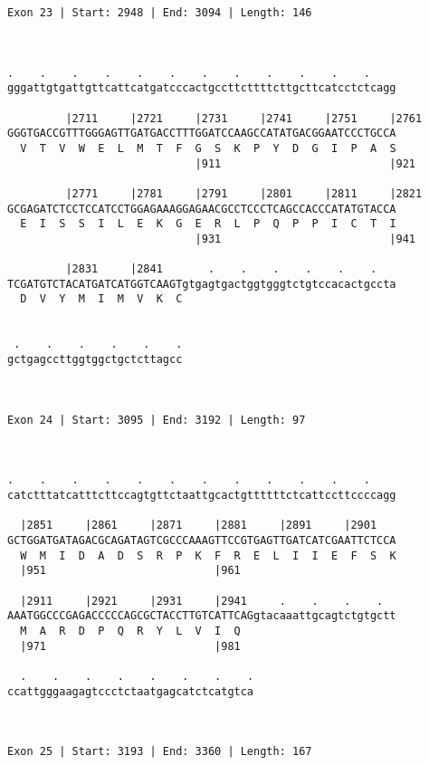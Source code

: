 \documentclass{article}
\begin{document}
{\begin{Verbatim}
Exon 23 | Start: 2948 | End: 3094 | Length: 146



.    .    .    .    .    .    .    .    .    .    .    .    
gggattgtgattgttcattcatgatcccactgccttcttttcttgcttcatcctctcagg
                                                            
         |2711     |2721     |2731     |2741     |2751     |2761
GGGTGACCGTTTGGGAGTTGATGACCTTTGGATCCAAGCCATATGACGGAATCCCTGCCA
  V  T  V  W  E  L  M  T  F  G  S  K  P  Y  D  G  I  P  A  S
                             |911                          |921
  
         |2771     |2781     |2791     |2801     |2811     |2821
GCGAGATCTCCTCCATCCTGGAGAAAGGAGAACGCCTCCCTCAGCCACCCATATGTACCA
  E  I  S  S  I  L  E  K  G  E  R  L  P  Q  P  P  I  C  T  I
                             |931                          |941
  
         |2831     |2841       .    .    .    .    .    .   
TCGATGTCTACATGATCATGGTCAAGTgtgagtgactggtgggtctgtccacactgccta
  D  V  Y  M  I  M  V  K  C                                 
                                                            
  
 .    .    .    .    .    .
gctgagccttggtggctgctcttagcc
                           
                           
 
Exon 24 | Start: 3095 | End: 3192 | Length: 97



.    .    .    .    .    .    .    .    .    .    .    .    
catctttatcatttcttccagtgttctaattgcactgttttttctcattccttccccagg
                                                            
  |2851     |2861     |2871     |2881     |2891     |2901   
GCTGGATGATAGACGCAGATAGTCGCCCAAAGTTCCGTGAGTTGATCATCGAATTCTCCA
  W  M  I  D  A  D  S  R  P  K  F  R  E  L  I  I  E  F  S  K
  |951                          |961                        
  
  |2911     |2921     |2931     |2941     .    .    .    .  
AAATGGCCCGAGACCCCCAGCGCTACCTTGTCATTCAGgtacaaattgcagtctgtgctt
  M  A  R  D  P  Q  R  Y  L  V  I  Q                        
  |971                          |981                        
  
  .    .    .    .    .    .    .    .
ccattgggaagagtccctctaatgagcatctcatgtca
                                      
                                      
 
Exon 25 | Start: 3193 | End: 3360 | Length: 167




\end{Verbatim}}
\end{document}
